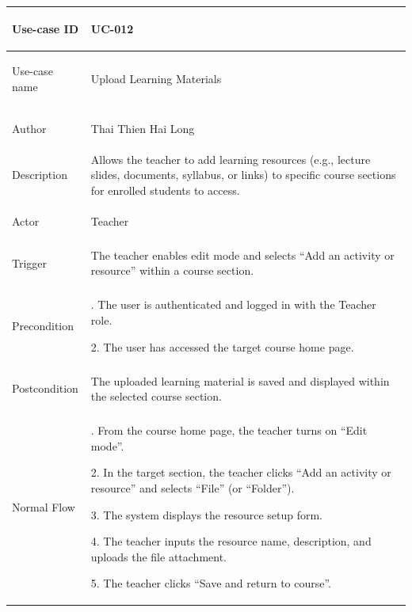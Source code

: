 {
\renewcommand{\arraystretch}{1.1}
\setlength{\tabcolsep}{8pt}
\begin{longtable}{|>{\bfseries\raggedright\arraybackslash}p{}|>{\raggedright\arraybackslash}p{}|}
\hline
Use-case ID & UC-012 \\ \hline
Use-case name & Upload Learning Materials \\ \hline
Author & Thai Thien Hai Long \\ \hline
Description &
Allows the teacher to add learning resources (e.g., lecture slides, documents, syllabus, or links) to specific course sections for enrolled students to access. \\ \hline
Actor & Teacher \\ \hline
Trigger &
The teacher enables edit mode and selects ``Add an activity or resource'' within a course section. \\ \hline
Precondition &
1. The user is authenticated and logged in with the Teacher role. \par
2. The user has accessed the target course home page. \\ \hline
Postcondition &
The uploaded learning material is saved and displayed within the selected course section. \\ \hline
Normal Flow &
1. From the course home page, the teacher turns on ``Edit mode''. \par
2. In the target section, the teacher clicks ``Add an activity or resource'' and selects ``File'' (or ``Folder''). \par
3. The system displays the resource setup form. \par
4. The teacher inputs the resource name, description, and uploads the file attachment. \par
5. The teacher clicks ``Save and return to course''. \par

\end{longtable}}
